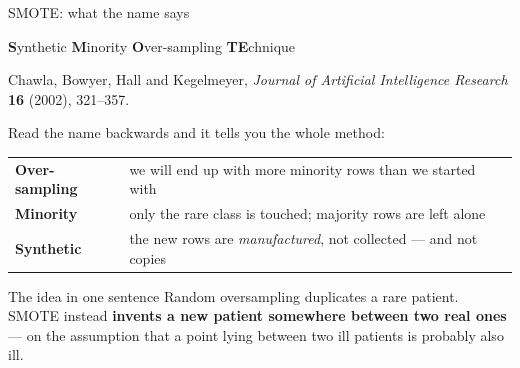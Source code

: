 \documentclass[aspectratio=169]{beamer}
\begin{document}
\begin{frame}[shrink=6]{SMOTE: what the name says}
  \begin{center}\Large
    \textbf{S}ynthetic \textbf{M}inority \textbf{O}ver-sampling
    \textbf{TE}chnique
  \end{center}
  \vspace{0.2em}
  \begin{center}\small
    Chawla, Bowyer, Hall and Kegelmeyer, \emph{Journal of Artificial
    Intelligence Research} \textbf{16} (2002), 321--357.
  \end{center}
  \vspace{0.3em}
  Read the name backwards and it tells you the whole method:
  \vspace{0.2em}
  \begin{center}\small
  \begin{tabular}{@{}ll@{}}
    \toprule
    \textbf{Over-sampling} & we will end up with more minority rows than we
      started with\\[3pt]
    \textbf{Minority} & only the rare class is touched; majority rows are
      left alone\\[3pt]
    \textbf{Synthetic} & the new rows are \emph{manufactured}, not collected
      --- and not copies\\
    \bottomrule
  \end{tabular}
  \end{center}
  \vspace{0.3em}
  \begin{alertblock}{The idea in one sentence}
    \small Random oversampling duplicates a rare patient. SMOTE instead
    \textbf{invents a new patient somewhere between two real ones} --- on the
    assumption that a point lying between two ill patients is probably also
    ill.
  \end{alertblock}
\end{frame}
\end{document}
